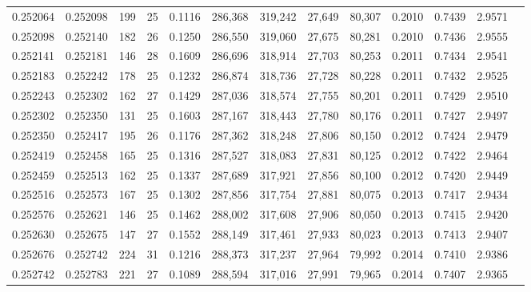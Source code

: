 \begin{tabular}{rrrrrrrrrrrrr}
0.252064 & 0.252098 &   199 &  25 &                                     0.1116 & 286,368 & 319,242 &  27,649 &  80,307 & 0.2010 & 0.7439 & 2.9571 \\
0.252098 & 0.252140 &   182 &  26 &                                     0.1250 & 286,550 & 319,060 &  27,675 &  80,281 & 0.2010 & 0.7436 & 2.9555 \\
0.252141 & 0.252181 &   146 &  28 &                                     0.1609 & 286,696 & 318,914 &  27,703 &  80,253 & 0.2011 & 0.7434 & 2.9541 \\
0.252183 & 0.252242 &   178 &  25 &                                     0.1232 & 286,874 & 318,736 &  27,728 &  80,228 & 0.2011 & 0.7432 & 2.9525 \\
0.252243 & 0.252302 &   162 &  27 &                                     0.1429 & 287,036 & 318,574 &  27,755 &  80,201 & 0.2011 & 0.7429 & 2.9510 \\
0.252302 & 0.252350 &   131 &  25 &                                     0.1603 & 287,167 & 318,443 &  27,780 &  80,176 & 0.2011 & 0.7427 & 2.9497 \\
0.252350 & 0.252417 &   195 &  26 &                                     0.1176 & 287,362 & 318,248 &  27,806 &  80,150 & 0.2012 & 0.7424 & 2.9479 \\
0.252419 & 0.252458 &   165 &  25 &                                     0.1316 & 287,527 & 318,083 &  27,831 &  80,125 & 0.2012 & 0.7422 & 2.9464 \\
0.252459 & 0.252513 &   162 &  25 &                                     0.1337 & 287,689 & 317,921 &  27,856 &  80,100 & 0.2012 & 0.7420 & 2.9449 \\
0.252516 & 0.252573 &   167 &  25 &                                     0.1302 & 287,856 & 317,754 &  27,881 &  80,075 & 0.2013 & 0.7417 & 2.9434 \\
0.252576 & 0.252621 &   146 &  25 &                                     0.1462 & 288,002 & 317,608 &  27,906 &  80,050 & 0.2013 & 0.7415 & 2.9420 \\
0.252630 & 0.252675 &   147 &  27 &                                     0.1552 & 288,149 & 317,461 &  27,933 &  80,023 & 0.2013 & 0.7413 & 2.9407 \\
0.252676 & 0.252742 &   224 &  31 &                                     0.1216 & 288,373 & 317,237 &  27,964 &  79,992 & 0.2014 & 0.7410 & 2.9386 \\
0.252742 & 0.252783 &   221 &  27 &                                     0.1089 & 288,594 & 317,016 &  27,991 &  79,965 & 0.2014 & 0.7407 & 2.9365 \\

\end{tabular}
